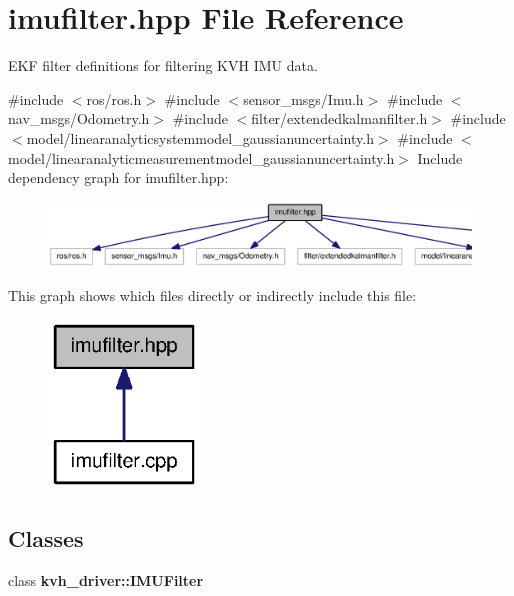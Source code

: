 \section{imufilter.\-hpp \-File \-Reference}
\label{imufilter_8hpp}


\-E\-K\-F filter definitions for filtering \-K\-V\-H \-I\-M\-U data.  


{\ttfamily \#include $<$ros/ros.\-h$>$}\*
{\ttfamily \#include $<$sensor\-\_\-msgs/\-Imu.\-h$>$}\*
{\ttfamily \#include $<$nav\-\_\-msgs/\-Odometry.\-h$>$}\*
{\ttfamily \#include $<$filter/extendedkalmanfilter.\-h$>$}\*
{\ttfamily \#include $<$model/linearanalyticsystemmodel\-\_\-gaussianuncertainty.\-h$>$}\*
{\ttfamily \#include $<$model/linearanalyticmeasurementmodel\-\_\-gaussianuncertainty.\-h$>$}\*
\-Include dependency graph for imufilter.\-hpp\-:\nopagebreak
\begin{figure}[H]
\begin{center}
\leavevmode
\includegraphics[width=350pt]{imufilter_8hpp__incl}
\end{center}
\end{figure}
\-This graph shows which files directly or indirectly include this file\-:\nopagebreak
\begin{figure}[H]
\begin{center}
\leavevmode
\includegraphics[width=114pt]{imufilter_8hpp__dep__incl}
\end{center}
\end{figure}
\subsection*{\-Classes}
\begin{DoxyCompactItemize}
\item 
class {\bf kvh\-\_\-driver\-::\-I\-M\-U\-Filter}
\end{DoxyCompactItemize}
